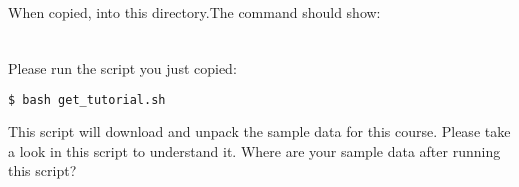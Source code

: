 \begin{frame}[fragile]
  \frametitle{}
  \begin{columns}[t]
	 \begin{column}{.5\textwidth}
		When copied,  into this directory.\newline The command  should show:
	 \end{column}
	 \begin{column}{.5\textwidth}
	   \begin{minipage}[t]{0.5\textwidth}
		 {\footnotesize \DTsetlength{0.2em}{1em}{0.2em}{0.4pt}{.6pt}
			 }
      \end{minipage}
	\end{column}
  \end{columns}
\end{frame}

\begin{frame}[fragile]
  \frametitle{}
  Please run the  script you just copied:
  \begin{lstlisting}[language=Bash, style=Shell,basicstyle=\footnotesize]
$ bash get_tutorial.sh
  \end{lstlisting}
  \begin{task}
  	This script will download and unpack the sample data for this course. Please take a look in this script to understand it. Where are your sample data after running this script?
  \end{task}
\end{frame}